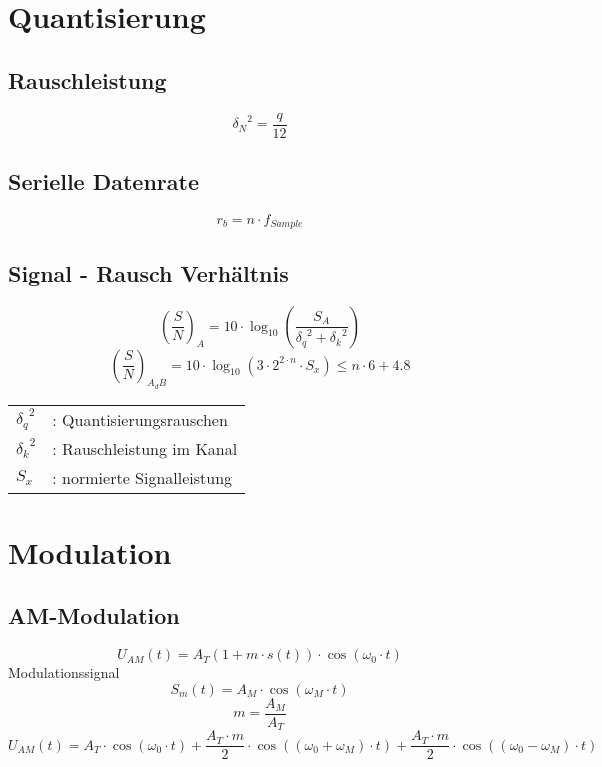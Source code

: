 \documentclass[a4paper, 10pt, fleqn]{article}
\begin{document}
\section{Quantisierung}
\subsection{Rauschleistung}
\[ {\delta_N}^2 = \frac{q}{12} \]

\subsection{Serielle Datenrate}
\[  r_b = n \cdot f_{Sample} \]

\subsection{Signal - Rausch Verhältnis}
\[ \left(\frac{S}{N}\right)_{A} = 
10 \cdot \log_{10} \left(\frac{S_A}{{\delta_q}^2 + {\delta_k}^2}\right) \]
\[ \left(\frac{S}{N}\right)_{A_dB} = 
10 \cdot \log_{10} \left(3 \cdot 2^{2 \cdot n} \cdot S_x\right) \leq n \cdot 6 + 4.8 \]
\begin{tabular}{@{}ll}
    ${\delta_q}^2$  & : Quantisierungsrauschen \\
    ${\delta_k}^2$  & : Rauschleistung im Kanal \\
    ${S_x}$         & : normierte Signalleistung \\
\end{tabular}

\section{Modulation}

\subsection{AM-Modulation}
\[ U_{AM}(t) = A_T (1 + m \cdot s(t)) \cdot \cos(\omega_0 \cdot t) \]
Modulationssignal
\[ S_m(t) = A_M \cdot \cos(\omega_M \cdot t) \]
\[ m = \frac{A_M}{A_T} \]
\[ U_{AM}(t) = A_T \cdot \cos(\omega_0 \cdot t) + \frac{A_T \cdot m}{2} \cdot \cos((\omega_0 + \omega_M) \cdot t) + \frac{A_T \cdot m}{2} \cdot \cos((\omega_0 - \omega_M) \cdot t) \]
\end{document}
